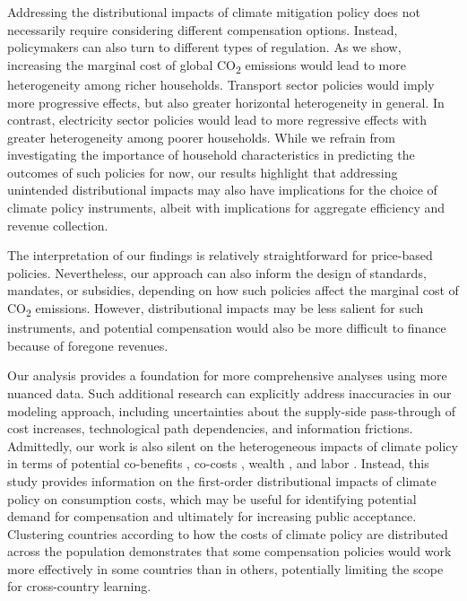 \documentclass[12pt, a4paper]{article}
\begin{document}
Addressing the distributional impacts of climate mitigation policy does not necessarily require considering different compensation options. Instead, policymakers can also turn to different types of regulation. As we show, increasing the marginal cost of global CO\textsubscript{2} emissions would lead to more heterogeneity among richer households. Transport sector policies would imply more progressive effects, but also greater horizontal heterogeneity in general. In contrast, electricity sector policies would lead to more regressive effects with greater heterogeneity among poorer households. While we refrain from investigating the importance of household characteristics in predicting the outcomes of such policies for now, our results highlight that addressing unintended distributional impacts may also have implications for the choice of climate policy instruments, albeit with implications for aggregate efficiency and revenue collection. 

The interpretation of our findings is relatively straightforward for price-based policies. Nevertheless, our approach can also inform the design of standards, mandates, or subsidies, depending on how such policies affect the marginal cost of CO\textsubscript{2} emissions. However, distributional impacts may be less salient for such instruments, and potential compensation would also be more difficult to finance because of foregone revenues. %

Our analysis provides a foundation for more comprehensive analyses using more nuanced data. Such additional research can explicitly address inaccuracies in our modeling approach, including uncertainties about the supply-side pass-through of cost increases, technological path dependencies, and information frictions. Admittedly, our work is also silent on the heterogeneous impacts of climate policy in terms of potential co-benefits \autocite[e.g.,][]{Holland.2019,Karlsson.2020}, co-costs \autocite[e.g.,][]{Fuje.2019,Greve.2022}, wealth \autocite[e.g.,][]{Fullerton.2011}, and labor \autocite[e.g.,][]{Castellanos.2024}. Instead, this study provides information on the first-order distributional impacts of climate policy on consumption costs, which may be useful for identifying potential demand for compensation and ultimately for increasing public acceptance. Clustering countries according to how the costs of climate policy are distributed across the population demonstrates that some compensation policies would work more effectively in some countries than in others, potentially limiting the scope for cross-country learning. %
\end{document}
